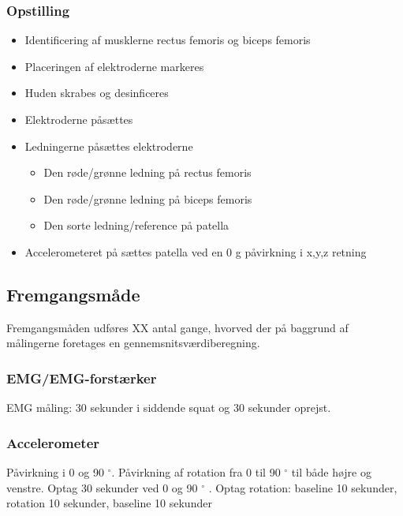 \subsubsection{Opstilling}
\begin{itemize}
\item Identificering af musklerne rectus femoris og biceps femoris 
\item Placeringen af elektroderne markeres
\item Huden skrabes og desinficeres
\item Elektroderne påsættes
\item Ledningerne påsættes elektroderne
\begin{itemize}
\item Den røde/grønne ledning på rectus femoris
\item Den røde/grønne ledning på biceps femoris
\item Den sorte ledning/reference på patella 
\end{itemize} 
\item Accelerometeret på sættes patella ved en 0 g påvirkning i x,y,z retning
\end{itemize}


\subsection{Fremgangsmåde}
Fremgangsmåden udføres XX antal gange, hvorved der på baggrund af målingerne foretages en gennemsnitsværdiberegning.

\subsubsection{EMG/EMG-forstærker}
EMG måling: 30 sekunder i siddende squat og 30 sekunder oprejst.

\subsubsection{Accelerometer}
Påvirkning i 0 og 90 $^{\circ}$.
Påvirkning af rotation fra 0 til 90 $^{\circ}$ til både højre og venstre.
Optag 30 sekunder ved 0 og 90 $^{\circ}$ .
Optag rotation: baseline 10 sekunder, rotation 10 sekunder, baseline 10 sekunder





